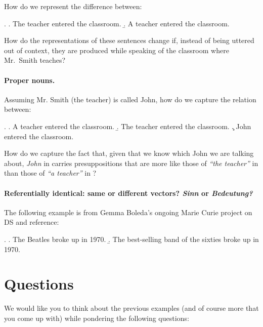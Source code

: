\documentclass[a4paper,12pt]{article}
\begin{document}
How do we represent the difference between:

\ex. \a. The teacher entered the classroom.
\b. A teacher entered the classroom.

How do the representations of these sentences change if, instead of
being uttered out of context, they are produced while speaking of the
classroom where Mr.~Smith teaches?

\paragraph{Proper nouns.}

Assuming Mr. Smith (the teacher) is called John, how do we capture the
relation between:

\ex. \a. A teacher entered the classroom.
\b. The teacher entered the classroom.
\c. John entered the classroom.

How do we capture the fact that, given that we know which John we are
talking about, \emph{John} in \Last[c] carries presuppositions that
are more like those of \emph{``the teacher''} in \Last[b] than those
of \emph{``a teacher''} in \Last[a]?

\paragraph{Referentially identical: same or different
  vectors? \emph{Sinn} or \emph{Bedeutung?}}

The following example is from Gemma Boleda's ongoing Marie Curie
project on DS and reference:

\ex. \a. The Beatles broke up in 1970.
\b. The best-selling band of the sixties broke up in 1970.





\section{Questions}
\label{sec:questions}

We would like you to think about the previous examples (and of course
more that you come up with) while pondering the following questions:
\end{document}
